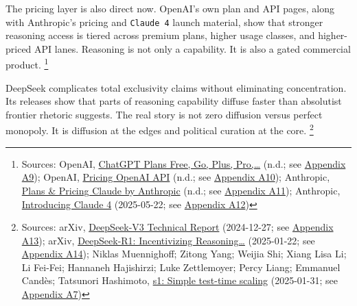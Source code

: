 \documentclass[
  american,
  11pt,
  letterpaper,
]{article}
\begin{document}
The pricing layer is also direct now. OpenAI's own plan and API pages,
along with Anthropic's pricing and \texttt{Claude\ 4} launch material,
show that stronger reasoning access is tiered across premium plans,
higher usage classes, and higher-priced API lanes. Reasoning is not only
a capability. It is also a gated commercial product. \footnote{Sources:
  OpenAI, \href{https://chatgpt.com/pricing/}{ChatGPT Plans \textbar{}
  Free, Go, Plus, Pro,\ldots{}} (n.d.; see
  \hyperref[appendix-a9-chatgpt-plans-free-go-plus-pro-business-and-enterprise]{Appendix
  A9}); OpenAI,
  \href{https://developers.openai.com/api/docs/pricing}{Pricing
  \textbar{} OpenAI API} (n.d.; see
  \hyperref[appendix-a10-pricing-openai-api]{Appendix A10}); Anthropic,
  \href{https://claude.com/pricing}{Plans \& Pricing \textbar{} Claude
  by Anthropic} (n.d.; see
  \hyperref[appendix-a11-plans-pricing-claude-by-anthropic]{Appendix
  A11}); Anthropic,
  \href{https://www.anthropic.com/news/claude-4}{Introducing Claude 4}
  (2025-05-22; see \hyperref[appendix-a12-introducing-claude-4]{Appendix
  A12})}

DeepSeek complicates total exclusivity claims without eliminating
concentration. Its releases show that parts of reasoning capability
diffuse faster than absolutist frontier rhetoric suggests. The real
story is not zero diffusion versus perfect monopoly. It is diffusion at
the edges and political curation at the core. \footnote{Sources: arXiv,
  \href{https://arxiv.org/abs/2412.19437}{DeepSeek-V3 Technical Report}
  (2024-12-27; see
  \hyperref[appendix-a13-deepseek-v3-technical-report]{Appendix A13});
  arXiv, \href{https://arxiv.org/abs/2501.12948}{DeepSeek-R1:
  Incentivizing Reasoning\ldots{}} (2025-01-22; see
  \hyperref[appendix-a14-deepseek-r1-incentivizing-reasoning-capability-in-llms-via-reinforcement-learning]{Appendix
  A14}); Niklas Muennighoff; Zitong Yang; Weijia Shi; Xiang Lisa Li; Li
  Fei-Fei; Hannaneh Hajishirzi; Luke Zettlemoyer; Percy Liang; Emmanuel
  Candès; Tatsunori Hashimoto,
  \href{https://arxiv.org/abs/2501.19393}{s1: Simple test-time scaling}
  (2025-01-31; see
  \hyperref[appendix-a7-s1-simple-test-time-scaling]{Appendix A7})}
\end{document}
